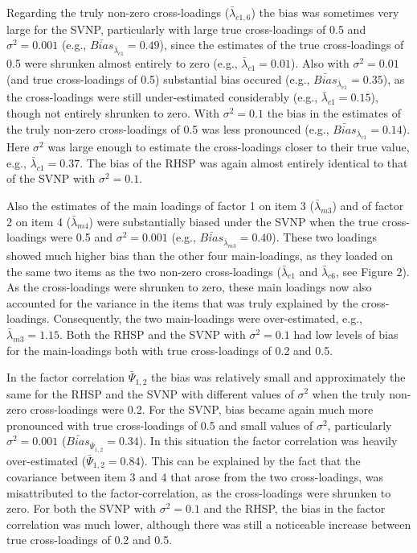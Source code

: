 \documentclass[
  man, donotrepeattitle,floatsintext]{apa6}
\begin{document}
Regarding the truly non-zero cross-loadings (\(\bar{\lambda}_{c 1, 6}\)) the bias was sometimes very large for the SVNP, particularly with large true cross-loadings of 0.5 and \(\sigma^2 = 0.001\) (e.g., \(\bar{Bias}_{\bar{\lambda}_{c 1}} = 0.49\)), since the estimates of the true cross-loadings of 0.5 were shrunken almost entirely to zero (e.g., \(\bar{\lambda}_{c 1} = 0.01\)). Also with \(\sigma^2 = 0.01\) (and true cross-loadings of 0.5) substantial bias occured (e.g., \(\bar{Bias}_{\bar{\lambda}_{c 1}} = 0.35\)), as the cross-loadings were still under-estimated considerably (e.g., \(\bar{\lambda}_{c 1} = 0.15\)), though not entirely shrunken to zero. With \(\sigma^2 = 0.1\) the bias in the estimates of the truly non-zero cross-loadings of 0.5 was less pronounced (e.g., \(\bar{Bias}_{\bar{\lambda}_{c 1}} = 0.14\)). Here \(\sigma^2\) was large enough to estimate the cross-loadings closer to their true value, e.g., \(\bar{\lambda}_{c 1} = 0.37\). The bias of the RHSP was again almost entirely identical to that of the SVNP with \(\sigma^2 = 0.1\).

Also the estimates of the main loadings of factor 1 on item 3 (\(\bar{\lambda}_{m 3}\)) and of factor 2 on item 4 (\(\bar{\lambda}_{m 4}\)) were substantially biased under the SVNP when the true cross-loadings were 0.5 and \(\sigma^2 = 0.001\) (e.g., \(\bar{Bias}_{\bar{\lambda}_{m 3}} = 0.40\)). These two loadings showed much higher bias than the other four main-loadings, as they loaded on the same two items as the two non-zero cross-loadings (\(\bar{\lambda}_{c 1}\) and \(\bar{\lambda}_{c 6}\), see Figure 2). As the cross-loadings were shrunken to zero, these main loadings now also accounted for the variance in the items that was truly explained by the cross-loadings. Consequently, the two main-loadings were over-estimated, e.g., \(\bar{\lambda}_{m 3} = 1.15\). Both the RHSP and the SVNP with \(\sigma^2 = 0.1\) had low levels of bias for the main-loadings both with true cross-loadings of 0.2 and 0.5.

In the factor correlation \(\bar{\Psi}_{1,2}\) the bias was relatively small and approximately the same for the RHSP and the SVNP with different values of \(\sigma^2\) when the truly non-zero cross-loadings were 0.2. For the SVNP, bias became again much more pronounced with true cross-loadings of 0.5 and small values of \(\sigma^2\), particularly \(\sigma^2 = 0.001\) (\(\bar{Bias}_{\bar{\Psi}_{1,2}} = 0.34\)). In this situation the factor correlation was heavily over-estimated (\(\bar{\Psi}_{1,2} = 0.84\)). This can be explained by the fact that the covariance between item 3 and 4 that arose from the two cross-loadings, was misattributed to the factor-correlation, as the cross-loadings were shrunken to zero. For both the SVNP with \(\sigma^2 = 0.1\) and the RHSP, the bias in the factor correlation was much lower, although there was still a noticeable increase between true cross-loadings of 0.2 and 0.5.
\end{document}
